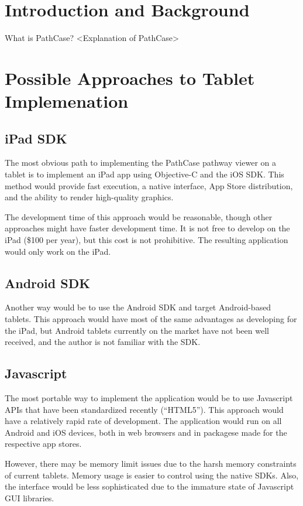 \section{Introduction and Background}

What is PathCase? <Explanation of PathCase>

\section{Possible Approaches to Tablet Implemenation}

\subsection{iPad SDK}

The most obvious path to implementing the PathCase pathway viewer on a tablet is to implement an iPad app using Objective-C and the iOS SDK. This method would provide fast execution, a native interface, App Store distribution, and the ability to render high-quality graphics.

The development time of this approach would be reasonable, though other approaches might have faster development time. It is not free to develop on the iPad (\$100 per year), but this cost is not prohibitive. The resulting application would only work on the iPad.

\subsection{Android SDK}

Another way would be to use the Android SDK and target Android-based tablets. This approach would have most of the same advantages as developing for the iPad, but Android tablets currently on the market have not been well received, and the author is not familiar with the SDK.

\subsection{Javascript}

The most portable way to implement the application would be to use Javascript APIs that have been standardized recently (``HTML5''). This approach would have a relatively rapid rate of development. The application would run on all Android and iOS devices, both in web browsers and in packagese made for the respective app stores.

However, there may be memory limit issues due to the harsh memory constraints of current tablets. Memory usage is easier to control using the native SDKs. Also, the interface would be less sophisticated due to the immature state of Javascript GUI libraries.
